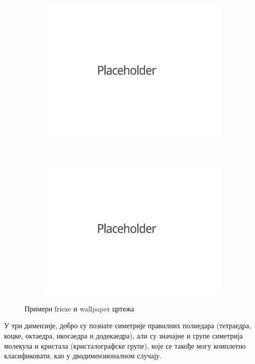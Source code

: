 \documentclass{report}
\theoremstyle{plain}
\theoremstyle{definition}
\begin{document}
\begin{figure}[h]
\centering
\begin{subfigure}{0.4\textwidth}
\includegraphics[width=\textwidth]{placeholder}
\end{subfigure}
~
\begin{subfigure}{0.4\textwidth}
\includegraphics[width=\textwidth]{placeholder}
\end{subfigure}
\caption{Примери frieze и wallpaper цртежа}
\end{figure}

У три димензије, добро су познате симетрије правилних полиедара (тетраедра, коцке, октаедра, икосаедра и додекаедра), али су значајне и групе симетрија молекула и кристала (кристалографске групе), које се такође могу комплетно класификовати, као у дводимензионалном случају.
\end{document}
